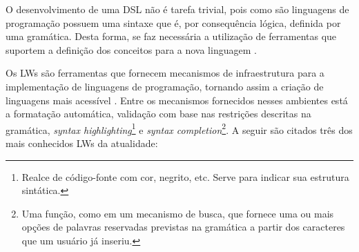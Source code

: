 O desenvolvimento de uma \ac{DSL} não é tarefa trivial, pois como são linguagens de programação possuem uma sintaxe que é, por consequência lógica, definida por uma gramática. 
Desta forma, se faz necessária a utilização de ferramentas que suportem a definição dos conceitos para a nova linguagem \cite{Fowler:2005}.

Os \acp{LW} são ferramentas que fornecem mecanismos de infraestrutura para a implementação de linguagens de programação, tornando assim a criação de linguagens mais acessível \cite{Wachsmuth:2014}. 
Entre os mecanismos fornecidos nesses ambientes está a formatação automática, validação com base nas restrições descritas na gramática, \textit{syntax highlighting}\footnote{Realce de código-fonte com cor, negrito, etc. Serve para indicar sua estrutura sintática.} e \textit{syntax completion}\footnote{Uma função, como em um mecanismo de busca, que fornece uma ou mais opções de palavras reservadas previstas na gramática a partir dos caracteres que um usuário já inseriu.}. 
A seguir são citados três dos mais conhecidos \acp{LW} da atualidade:

